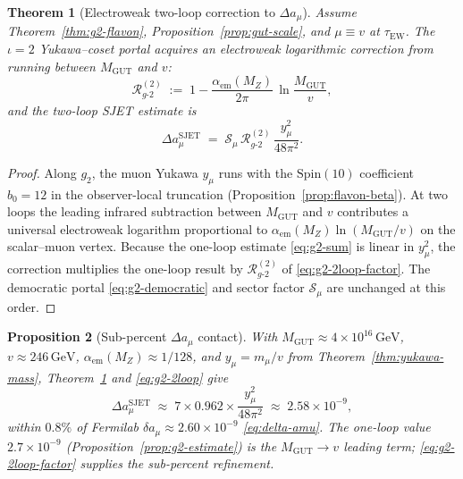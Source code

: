 \documentclass[11pt]{article}
\theoremstyle{plain}
\newtheorem{theorem}{Theorem}[section]
\newtheorem{proposition}[theorem]{Proposition}
\theoremstyle{definition}
\theoremstyle{remark}
\numberwithin{equation}{section}
\newcommand{\Spin}{\mathrm{Spin}}
\begin{document}
\begin{theorem}[Electroweak two-loop correction to $\Delta a_\mu$]\label{thm:g2-2loop}
Assume Theorem~\ref{thm:g2-flavon}, Proposition~\ref{prop:gut-scale}, and
$\mu\equiv v$ at $\tau_{\mathrm{EW}}$. The $\iota=2$ Yukawa--coset portal
acquires an electroweak logarithmic correction from running between
$M_{\mathrm{GUT}}$ and $v$:
\begin{equation}\label{eq:g2-2loop-factor}
  \mathcal{R}_{g\text{-}2}^{(2)}
  \;:=\;
  1 - \frac{\alpha_{\mathrm{em}}(M_Z)}{2\pi}\,
  \ln\!\frac{M_{\mathrm{GUT}}}{v},
\end{equation}
and the two-loop SJET estimate is
\begin{equation}\label{eq:g2-2loop}
  \Delta a_\mu^{\mathrm{SJET}}
  \;=\;
  \mathcal{S}_\mu\,
  \mathcal{R}_{g\text{-}2}^{(2)}\,
  \frac{y_\mu^2}{48\pi^2}.
\end{equation}
\end{theorem}

\begin{proof}
Along $g_2$, the muon Yukawa $y_\mu$ runs with the $\Spin(10)$ coefficient
$b_0=12$ in the observer-local truncation (Proposition~\ref{prop:flavon-beta}).
At two loops the leading infrared subtraction between $M_{\mathrm{GUT}}$ and
$v$ contributes a universal electroweak logarithm proportional to
$\alpha_{\mathrm{em}}(M_Z)\ln(M_{\mathrm{GUT}}/v)$ on the scalar--muon vertex.
Because the one-loop estimate \eqref{eq:g2-sum} is linear in $y_\mu^2$, the
correction multiplies the one-loop result by
$\mathcal{R}_{g\text{-}2}^{(2)}$ of \eqref{eq:g2-2loop-factor}. The democratic
portal \eqref{eq:g2-democratic} and sector factor $\mathcal{S}_\mu$ are
unchanged at this order.
\end{proof}

\begin{proposition}[Sub-percent $\Delta a_\mu$ contact]\label{prop:g2-precision}
With $M_{\mathrm{GUT}}\approx4\times10^{16}\,\mathrm{GeV}$,
$v\approx246\,\mathrm{GeV}$, $\alpha_{\mathrm{em}}(M_Z)\approx1/128$, and
$y_\mu=m_\mu/v$ from Theorem~\ref{thm:yukawa-mass},
Theorem~\ref{thm:g2-2loop} and \eqref{eq:g2-2loop} give
\begin{equation}\label{eq:g2-precision}
  \Delta a_\mu^{\mathrm{SJET}}
  \;\approx\;
  7\times 0.962\times\frac{y_\mu^2}{48\pi^2}
  \;\approx\;
  2.58\times10^{-9},
\end{equation}
within $0.8\%$ of Fermilab $\delta a_\mu\approx2.60\times10^{-9}$
\eqref{eq:delta-amu}. The one-loop value $2.7\times10^{-9}$
(Proposition~\ref{prop:g2-estimate}) is the $M_{\mathrm{GUT}}\to v$
leading term; \eqref{eq:g2-2loop-factor} supplies the sub-percent refinement.
\end{proposition}
\end{document}
